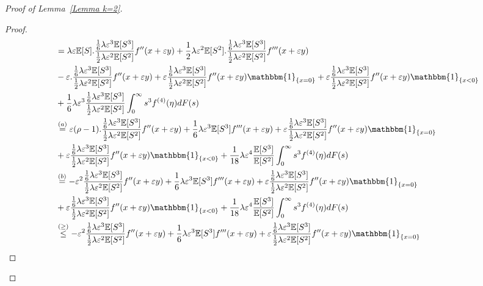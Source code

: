 \documentclass[11pt,letterpaper,reqno]{article}
\theoremstyle{thmstyleone}%
\theoremstyle{thmstyletwo}%
\theoremstyle{thmstylethree}%
\numberwithin{equation}{section}
\begin{document}
\begin{proof}[Proof of Lemma~\ref{Lemma k=2}]
\begin{proof}
\begin{align*}
  &=\lambda \varepsilon \mathbb E[S].\frac{\frac{1}{6}\lambda \varepsilon^3 \mathbb E[S^3]}{\frac{1}{2}\lambda \varepsilon^2 \mathbb E[S^2]}f''(x+\varepsilon y)+\frac{1}{2}\lambda \varepsilon^2 \mathbb E[S^2].\frac{\frac{1}{6}\lambda \varepsilon^3 \mathbb E[S^3]}{\frac{1}{2}\lambda \varepsilon^2 \mathbb E[S^2]}f'''(x+\varepsilon y)\\
    &-\varepsilon.\frac{\frac{1}{6}\lambda \varepsilon^3 \mathbb E[S^3]}{\frac{1}{2}\lambda \varepsilon^2 \mathbb E[S^2]} f''(x+\varepsilon y)+\varepsilon \frac{\frac{1}{6}\lambda \varepsilon^3 \mathbb E[S^3]}{\frac{1}{2}\lambda \varepsilon^2 \mathbb E[S^2]}f''(x+\varepsilon y)\mathbbm{1}_{\{x=0\}}+\varepsilon \frac{\frac{1}{6}\lambda \varepsilon^3 \mathbb E[S^3]}{\frac{1}{2}\lambda \varepsilon^2 \mathbb E[S^2]}f''(x+\varepsilon y)\mathbbm{1}_{\{x<0\}}\\
    &+\frac{1}{6} \lambda \varepsilon^3 \frac{\frac{1}{6}\lambda \varepsilon^3 \mathbb E[S^3]}{\frac{1}{2}\lambda \varepsilon^2 \mathbb E[S^2]} \int_0^\infty s^3 f^{(4)}(\eta )dF(s)\\
    &\stackrel{(a)}{=}\varepsilon(\rho-1 ).\frac{\frac{1}{6}\lambda \varepsilon^3 \mathbb E[S^3]}{\frac{1}{2}\lambda \varepsilon^2 \mathbb E[S^2]}f''(x+\varepsilon y)+\frac{1}{6}\lambda \varepsilon^3 \mathbb E[S^3]f'''(x+\varepsilon y)+\varepsilon \frac{\frac{1}{6}\lambda \varepsilon^3 \mathbb E[S^3]}{\frac{1}{2}\lambda \varepsilon^2 \mathbb E[S^2]}  f''(x+\varepsilon y)\mathbbm{1}_{\{x=0\}}\\
    &+\varepsilon \frac{\frac{1}{6}\lambda \varepsilon^3 \mathbb E[S^3]}{\frac{1}{2}\lambda \varepsilon^2 \mathbb E[S^2]}  f''(x+\varepsilon y)\mathbbm{1}_{\{x<0\}}+\frac{1}{18} \lambda \varepsilon^4 \frac{\mathbb E[S^3]}{\mathbb E[S^2]}\int_0^\infty s^3 f^{(4)}(\eta )dF(s)\\
    &\stackrel{(b)}{=}-\varepsilon^2\frac{\frac{1}{6}\lambda \varepsilon^3 \mathbb E[S^3]}{\frac{1}{2}\lambda \varepsilon^2 \mathbb E[S^2]}f''(x+\varepsilon y)+\frac{1}{6}\lambda \varepsilon^3 \mathbb E[S^3]f'''(x+\varepsilon y)+\varepsilon \frac{\frac{1}{6}\lambda \varepsilon^3 \mathbb E[S^3]}{\frac{1}{2}\lambda \varepsilon^2 \mathbb E[S^2]} f''(x+\varepsilon y)\mathbbm{1}_{\{x=0\}}\\
    &+\varepsilon \frac{\frac{1}{6}\lambda \varepsilon^3 \mathbb E[S^3]}{\frac{1}{2}\lambda \varepsilon^2 \mathbb E[S^2]} f''(x+\varepsilon y)\mathbbm{1}_{\{x<0\}}+\frac{1}{18} \lambda \varepsilon^4 \frac{\mathbb E[S^3]}{\mathbb E[S^2]}\int_0^\infty s^3 f^{(4)}(\eta )dF(s)\\
   &\stackrel{(\geq)} {\leq} -\varepsilon^2\frac{\frac{1}{6}\lambda \varepsilon^3 \mathbb E[S^3]}{\frac{1}{2}\lambda \varepsilon^2 \mathbb E[S^2]}f''(x+\varepsilon y)+\frac{1}{6}\lambda \varepsilon^3 \mathbb E[S^3]f'''(x+\varepsilon y)+\varepsilon \frac{\frac{1}{6}\lambda \varepsilon^3 \mathbb E[S^3]}{\frac{1}{2}\lambda \varepsilon^2 \mathbb E[S^2]} f''(x+\varepsilon y)\mathbbm{1}_{\{x=0\}}\\

\end{align*}
\end{proof}
\end{proof}
\end{document}
